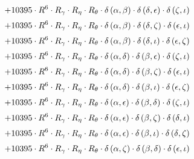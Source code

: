 \begin{subequations}
\begin{gather}
 \\[0.2em] \notag 		 + 10395 \cdot R^{6} \cdot R_{\gamma{}} \cdot R_{\eta{}} \cdot R_{\theta{}} \cdot \delta{}\left(\alpha{}, \beta{}\right) \cdot \delta{}\left(\delta{}, \epsilon{}\right) \cdot \delta{}\left(\zeta{}, \iota{}\right) 
 \\[0.2em] \notag 		 + 10395 \cdot R^{6} \cdot R_{\gamma{}} \cdot R_{\eta{}} \cdot R_{\theta{}} \cdot \delta{}\left(\alpha{}, \beta{}\right) \cdot \delta{}\left(\delta{}, \zeta{}\right) \cdot \delta{}\left(\epsilon{}, \iota{}\right) 
 \\[0.2em] \notag 		 + 10395 \cdot R^{6} \cdot R_{\gamma{}} \cdot R_{\eta{}} \cdot R_{\theta{}} \cdot \delta{}\left(\alpha{}, \beta{}\right) \cdot \delta{}\left(\delta{}, \iota{}\right) \cdot \delta{}\left(\epsilon{}, \zeta{}\right) 
 \\[0.2em] \notag 		 + 10395 \cdot R^{6} \cdot R_{\gamma{}} \cdot R_{\eta{}} \cdot R_{\theta{}} \cdot \delta{}\left(\alpha{}, \delta{}\right) \cdot \delta{}\left(\beta{}, \epsilon{}\right) \cdot \delta{}\left(\zeta{}, \iota{}\right) 
 \\[0.2em] \notag 		 + 10395 \cdot R^{6} \cdot R_{\gamma{}} \cdot R_{\eta{}} \cdot R_{\theta{}} \cdot \delta{}\left(\alpha{}, \delta{}\right) \cdot \delta{}\left(\beta{}, \zeta{}\right) \cdot \delta{}\left(\epsilon{}, \iota{}\right) 
 \\[0.2em] \notag 		 + 10395 \cdot R^{6} \cdot R_{\gamma{}} \cdot R_{\eta{}} \cdot R_{\theta{}} \cdot \delta{}\left(\alpha{}, \delta{}\right) \cdot \delta{}\left(\beta{}, \iota{}\right) \cdot \delta{}\left(\epsilon{}, \zeta{}\right) 
 \\[0.2em] \notag 		 + 10395 \cdot R^{6} \cdot R_{\gamma{}} \cdot R_{\eta{}} \cdot R_{\theta{}} \cdot \delta{}\left(\alpha{}, \epsilon{}\right) \cdot \delta{}\left(\beta{}, \delta{}\right) \cdot \delta{}\left(\zeta{}, \iota{}\right) 
 \\[0.2em] \notag 		 + 10395 \cdot R^{6} \cdot R_{\gamma{}} \cdot R_{\eta{}} \cdot R_{\theta{}} \cdot \delta{}\left(\alpha{}, \epsilon{}\right) \cdot \delta{}\left(\beta{}, \zeta{}\right) \cdot \delta{}\left(\delta{}, \iota{}\right) 
 \\[0.2em] \notag 		 + 10395 \cdot R^{6} \cdot R_{\gamma{}} \cdot R_{\eta{}} \cdot R_{\theta{}} \cdot \delta{}\left(\alpha{}, \epsilon{}\right) \cdot \delta{}\left(\beta{}, \iota{}\right) \cdot \delta{}\left(\delta{}, \zeta{}\right) 
 \\[0.2em] \notag 		 + 10395 \cdot R^{6} \cdot R_{\gamma{}} \cdot R_{\eta{}} \cdot R_{\theta{}} \cdot \delta{}\left(\alpha{}, \zeta{}\right) \cdot \delta{}\left(\beta{}, \delta{}\right) \cdot \delta{}\left(\epsilon{}, \iota{}\right) 

\end{gather}
\end{subequations}
